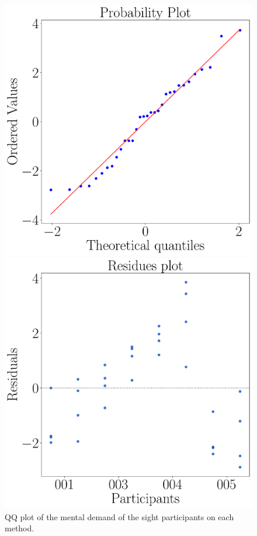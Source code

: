\begin{figure}[!htb]
    \centering
    \begin{minipage}{0.45\textwidth}
        \centering
        \includegraphics[width = \textwidth]{Resultados/Sagat/Figuras/pdf/qqplot_sagat_avg_two_way_sight.pdf}
        \caption{QQ plot of the mental demand of the sight participants on each method.}
        \label{fig:qqplot_sagat_avg_two_way_sight}
    \end{minipage}
    \begin{minipage}{0.075\textwidth}
        \hfill
    \end{minipage}
    \begin{minipage}{0.45\textwidth}
        \centering
        \includegraphics[width = \textwidth]{Resultados/Sagat/Figuras/pdf/residplot_sagat_avg_two_way_sight.pdf}

\end{minipage}
\end{figure}
